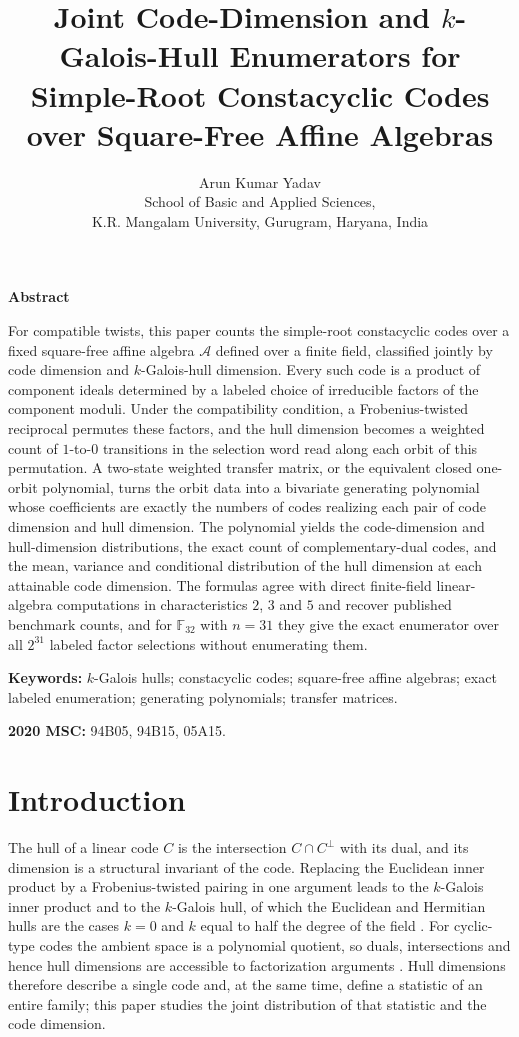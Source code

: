 \documentclass[10pt,a4paper]{article}
\title{Joint Code-Dimension and \texorpdfstring{$k$}{k}-Galois-Hull Enumerators for Simple-Root Constacyclic Codes over Square-Free Affine Algebras}
\author{\normalsize Arun Kumar Yadav\\
\small School of Basic and Applied Sciences,\\
\small K.R. Mangalam University, Gurugram, Haryana, India}
\date{}
\newcommand{\F}{\mathbb F}
\newcommand{\A}{\mathcal A}
\numberwithin{equation}{section}
\theoremstyle{plain}
\theoremstyle{definition}
\theoremstyle{remark}
\begin{document}
\maketitle


\begin{center}
\noindent\textbf{Abstract}
\end{center}
For compatible twists, this paper counts the simple-root constacyclic codes over a fixed square-free affine algebra $\A$ defined over a finite field, classified jointly by code dimension and $k$-Galois-hull dimension. Every such code is a product of component ideals determined by a labeled choice of irreducible factors of the component moduli. Under the compatibility condition, a Frobenius-twisted reciprocal permutes these factors, and the hull dimension becomes a weighted count of $1$-to-$0$ transitions in the selection word read along each orbit of this permutation. A two-state weighted transfer matrix, or the equivalent closed one-orbit polynomial, turns the orbit data into a bivariate generating polynomial whose coefficients are exactly the numbers of codes realizing each pair of code dimension and hull dimension. The polynomial yields the code-dimension and hull-dimension distributions, the exact count of complementary-dual codes, and the mean, variance and conditional distribution of the hull dimension at each attainable code dimension. The formulas agree with direct finite-field linear-algebra computations in characteristics $2$, $3$ and $5$ and recover published benchmark counts, and for $\F_{32}$ with $n=31$ they give the exact enumerator over all $2^{31}$ labeled factor selections without enumerating them.

\medskip
\noindent\textbf{Keywords:} $k$-Galois hulls; constacyclic codes; square-free affine algebras; exact labeled enumeration; generating polynomials; transfer matrices.

\medskip
\noindent\textbf{2020 MSC:} 94B05, 94B15, 05A15.

\section{Introduction}\label{sec:intro}

The hull of a linear code $C$ is the intersection $C\cap C^{\perp}$ with its
dual, and its dimension is a structural invariant of the code. Replacing the
Euclidean inner product by a Frobenius-twisted pairing in one argument leads to
the $k$-Galois inner product and to the $k$-Galois hull, of which the Euclidean
and Hermitian hulls are the cases $k=0$ and $k$ equal to half the degree of the
field \cite{fanZhang2017}. For cyclic-type codes the ambient space is a
polynomial quotient, so duals, intersections and hence hull dimensions are
accessible to factorization arguments \cite{huffmanPless2003}. Hull dimensions
therefore describe a single code and, at the same time, define a statistic of an
entire family; this paper studies the joint distribution of that statistic and
the code dimension.
\end{document}

